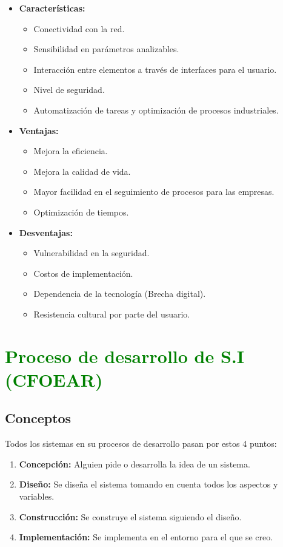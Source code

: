 \documentclass{templateNote}
\begin{document}
\begin{itemize}
    \item \textbf{Características:}
    \begin{itemize}
        \item Conectividad con la red.
        \item Sensibilidad en parámetros analizables.
        \item Interacción entre elementos a través de interfaces para el usuario.
        \item Nivel de seguridad.
        \item Automatización de tareas y optimización de procesos industriales.
    \end{itemize}
    \item \textbf{Ventajas:}
    \begin{itemize}
        \item Mejora la eficiencia.
        \item Mejora la calidad de vida.
        \item Mayor facilidad en el seguimiento de procesos para las empresas.
        \item Optimización de tiempos.
    \end{itemize}
    \item \textbf{Desventajas:}
    \begin{itemize}
        \item Vulnerabilidad en la seguridad.
        \item Costos de implementación.
        \item Dependencia de la tecnología (Brecha digital).
        \item Resistencia cultural por parte del usuario.
    \end{itemize}
\end{itemize}

\newpage


\section{\textcolor{green}{Proceso de desarrollo de S.I (CFOEAR)}}

\subsection{Conceptos}
\noindent Todos los sistemas en su procesos de desarrollo pasan por estos 4 puntos:
\begin{enumerate}
    \item \textbf{Concepción:} Alguien pide o desarrolla la idea de un sistema.
    \item \textbf{Diseño:} Se diseña el sistema tomando en cuenta todos los aspectos y variables.
    \item \textbf{Construcción:} Se construye el sistema siguiendo el diseño.
    \item \textbf{Implementación:} Se implementa en el entorno para el que se creo.
\end{enumerate}
\end{document}
